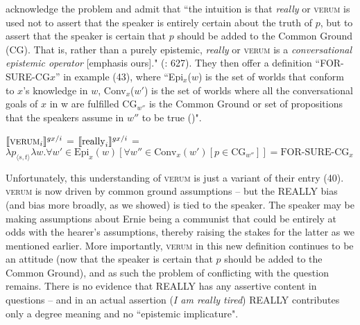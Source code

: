 \documentclass[output=paper,colorlinks,citecolor=brown]{langscibook}
\begin{document}
\citet{romero2004} acknowledge the problem and admit that ``the intuition is that \textit{really} or \textsc{verum} is used not to assert that the speaker is entirely certain about the truth of $p$, but to assert that the speaker is certain that $p$ should be added to the Common Ground (CG). That is, rather than a purely epistemic, \textit{really} or \textsc{verum} is a \textit{conversational epistemic operator} [emphasis ours]." (\citealt{romero2004}: 627). They then offer a definition ``FOR-SURE-CG$x$'' in example (43), where ``Epi$_x$($w$) is the set of worlds that conform to $x$'s knowledge in $w$, Conv$_x$($w'$) is the set of worlds where all the conversational goals of $x$ in w are fulfilled CG$_{w''}$ is the Common Ground or set of propositions that the speakers assume in $w''$ to be true (\citealt{stalnaker1978, roberts1996})".

\ea $\llbracket\textsc{verum}_i\rrbracket\textsuperscript{\ensuremath{gx/i}}$ =  $\llbracket\text{really}_i\rrbracket\textsuperscript{\ensuremath{gx/i}}$   = 
\sn $\lambda p _{{\langle}s,t{\rangle}} \lambda w.\forall w' \in \text{Epi}_x (w) [\forall w'' \in \text{Conv}_x(w') [p \in \text{CG}_{w''}]] = \text{FOR-SURE-CG}_{x}$
\z


Unfortunately, this understanding of \textsc{verum} is just a variant of their entry (40). \textsc{verum} is now driven by common ground assumptions --  but the \textsc{REALLY} bias (and bias more broadly, as we showed)  is tied to the speaker. The speaker may be making assumptions about Ernie being a communist that could be entirely at odds with the hearer's assumptions, thereby raising the stakes for the latter as we mentioned earlier. More importantly,  \textsc{verum} in this new definition continues to be an attitude  (now that the speaker is certain that $p$ should be added to the Common Ground), and as such the problem of conflicting with the question remains. There is no evidence that \textsc{REALLY} has any assertive content in questions --   and in an actual assertion (\textit{I am really tired}) \textsc{REALLY} contributes only a degree meaning and no ``epistemic implicature".
\end{document}
